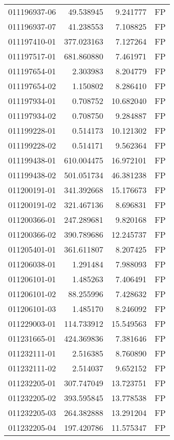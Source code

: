 \begin{tabular}{lrrl}
011196937-06 &   49.538945 &     9.241777 &   FP \\
011196937-07 &   41.238553 &     7.108825 &   FP \\
011197410-01 &  377.023163 &     7.127264 &   FP \\
011197517-01 &  681.860880 &     7.461971 &   FP \\
011197654-01 &    2.303983 &     8.204779 &   FP \\
011197654-02 &    1.150802 &     8.286410 &   FP \\
011197934-01 &    0.708752 &    10.682040 &   FP \\
011197934-02 &    0.708750 &     9.284887 &   FP \\
011199228-01 &    0.514173 &    10.121302 &   FP \\
011199228-02 &    0.514171 &     9.562364 &   FP \\
011199438-01 &  610.004475 &    16.972101 &   FP \\
011199438-02 &  501.051734 &    46.381238 &   FP \\
011200191-01 &  341.392668 &    15.176673 &   FP \\
011200191-02 &  321.467136 &     8.696831 &   FP \\
011200366-01 &  247.289681 &     9.820168 &   FP \\
011200366-02 &  390.789686 &    12.245737 &   FP \\
011205401-01 &  361.611807 &     8.207425 &   FP \\
011206038-01 &    1.291484 &     7.988093 &   FP \\
011206101-01 &    1.485263 &     7.406491 &   FP \\
011206101-02 &   88.255996 &     7.428632 &   FP \\
011206101-03 &    1.485170 &     8.246092 &   FP \\
011229003-01 &  114.733912 &    15.549563 &   FP \\
011231665-01 &  424.369836 &     7.381646 &   FP \\
011232111-01 &    2.516385 &     8.760890 &   FP \\
011232111-02 &    2.514037 &     9.652152 &   FP \\
011232205-01 &  307.747049 &    13.723751 &   FP \\
011232205-02 &  393.595845 &    13.778538 &   FP \\
011232205-03 &  264.382888 &    13.291204 &   FP \\
011232205-04 &  197.420786 &    11.575347 &   FP \\

\end{tabular}
